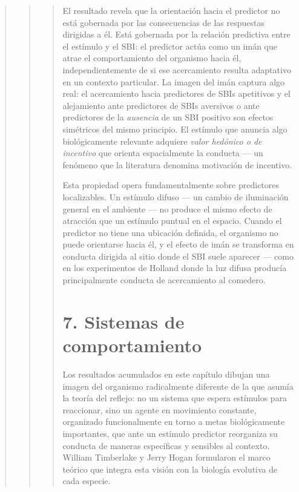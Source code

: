 \documentclass[
  letterpaper,
  DIV=11,
  numbers=noendperiod]{scrreprt}
\begin{document}
\begin{tcolorbox}[enhanced jigsaw, arc=.35mm, bottomrule=.15mm, breakable, colback=white, colframe=quarto-callout-note-color-frame, left=2mm, leftrule=.75mm, opacityback=0, rightrule=.15mm, toprule=.15mm]
\begin{quote}
\begin{quote}
\begin{quote}
El resultado revela que la orientación hacia el predictor no está
gobernada por las consecuencias de las respuestas dirigidas a él. Está
gobernada por la relación predictiva entre el estímulo y el SBI: el
predictor actúa como un imán que atrae el comportamiento del organismo
hacia él, independientemente de si ese acercamiento resulta adaptativo
en un contexto particular. La imagen del imán captura algo real: el
acercamiento hacia predictores de SBIs apetitivos y el alejamiento ante
predictores de SBIs aversivos o ante predictores de la \emph{ausencia}
de un SBI positivo son efectos simétricos del mismo principio. El
estímulo que anuncia algo biológicamente relevante adquiere \emph{valor
hedónico o de incentivo} que orienta espacialmente la conducta --- un
fenómeno que la literatura denomina motivación de incentivo.

Esta propiedad opera fundamentalmente sobre predictores localizables. Un
estímulo difuso --- un cambio de iluminación general en el ambiente ---
no produce el mismo efecto de atracción que un estímulo puntual en el
espacio. Cuando el predictor no tiene una ubicación definida, el
organismo no puede orientarse hacia él, y el efecto de imán se
transforma en conducta dirigida al sitio donde el SBI suele aparecer ---
como en los experimentos de Holland donde la luz difusa producía
principalmente conducta de acercamiento al comedero.

\mbox{}%
\section{7. Sistemas de
comportamiento}\label{sistemas-de-comportamiento}

Los resultados acumulados en este capítulo dibujan una imagen del
organismo radicalmente diferente de la que asumía la teoría del reflejo:
no un sistema que espera estímulos para reaccionar, sino un agente en
movimiento constante, organizado funcionalmente en torno a metas
biológicamente importantes, que ante un estímulo predictor reorganiza su
conducta de maneras específicas y sensibles al contexto. William
Timberlake y Jerry Hogan formularon el marco teórico que integra esta
visión con la biología evolutiva de cada especie.


\end{quote}
\end{quote}
\end{quote}
\end{tcolorbox}
\end{document}
